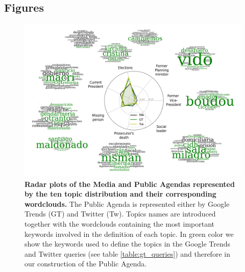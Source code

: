 \documentclass{bmcart}
\begin{document}
\begin{backmatter}

\section*{Figures}

\begin{figure}[h!]
\includegraphics[width = \textwidth]{Fig1.pdf}
\caption{\textbf{Radar plots of the Media and Public Agendas represented by the ten topic distribution and their corresponding wordclouds.} The Public Agenda is represented either by Google Trends (GT) and Twitter (Tw). 
Topics names are introduced together with the wordclouds containing the most important keywords involved in the definition of each topic. In green color we show the keywords used to define the topics in the Google Trends and Twitter queries (see table \ref{table:gt_queries}) and therefore in our construction of the Public Agenda.}
\label{fig:topics_wordclouds}
\end{figure}


\end{backmatter}
\end{document}
